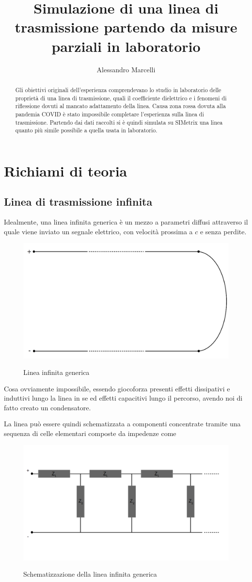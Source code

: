 \documentclass[a4paper,12pt]{report}
\title{Simulazione di una linea di trasmissione partendo da misure parziali in laboratorio}
\author{Alessandro Marcelli}
\begin{document}
\maketitle

\begin{abstract}
Gli obiettivi originali dell'esperienza comprendevano lo studio in laboratorio delle proprietà di una linea di trasmissione, quali il coefficiente dielettrico e i fenomeni di riflessione dovuti al mancato adattamento della linea.
Causa zona rossa dovuta alla pandemia COVID è stato impossibile completare l'esperienza sulla linea di trasmissione. Partendo dai dati raccolti si è quindi simulata su SIMetrix una linea quanto più simile possibile a quella usata in laboratorio. 
\end{abstract}

\tableofcontents

\newpage
\section{Richiami di teoria}

\subsection{Linea di trasmissione infinita}
Idealmente, una linea infinita generica è un mezzo a parametri diffusi attraverso il quale viene inviato un segnale elettrico, con velocità prossima a $c$ e senza perdite. 
\begin{figure}[!htb]
	\centering
	\includegraphics[width=.4\textwidth]{pictures/linea1.png}
	\label{fig:largenenough}
	\caption{\label{lul} \small Linea infinita generica}
\end{figure}

Cosa ovviamente impossibile, essendo giocoforza presenti effetti dissipativi e induttivi lungo la linea in se ed effetti capacitivi lungo il percorso, avendo noi di fatto creato un condensatore. 

La linea può essere quindi schematizzata a componenti concentrate tramite una sequenza di celle elementari composte da impedenze come
\begin{figure}[!htb]
	\centering
	\includegraphics[width=.5\textwidth]{pictures/linea2.png}
	\label{fig:largenenough}
	\caption{\label{kekw} \small Schematizzazione della linea infinita generica}
\end{figure}
\end{document}
